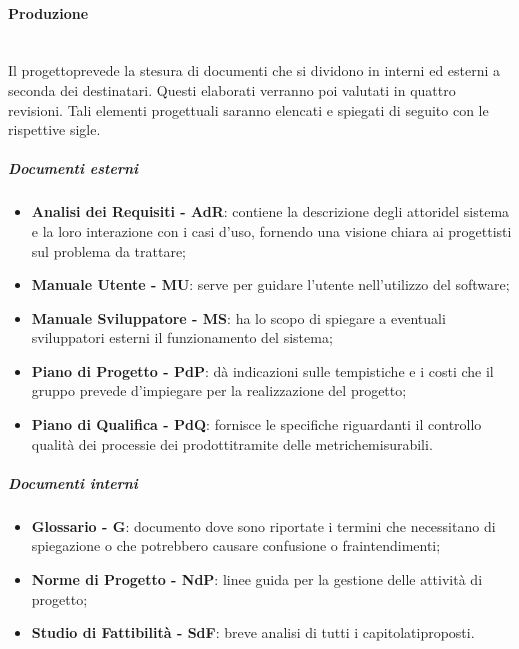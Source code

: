             \paragraph{Produzione}\mbox{}\\ [1mm]
                    Il progetto\glosp prevede la stesura di documenti che si dividono in interni ed esterni a seconda dei destinatari. Questi elaborati verranno poi valutati
                    in quattro revisioni. Tali elementi progettuali saranno elencati e spiegati di seguito con le rispettive sigle.
                \subparagraph{Documenti esterni}
                    \begin{itemize}
                        \item \textbf{Analisi dei Requisiti - AdR}: contiene la descrizione degli attori\glosp del sistema e la loro interazione con i casi d'uso\glo,
                                                                    fornendo una visione chiara ai progettisti sul problema da trattare;
                        \item \textbf{Manuale Utente - MU}: serve per guidare l'utente nell'utilizzo del software;
                        \item \textbf{Manuale Sviluppatore - MS}: ha lo scopo di spiegare a eventuali sviluppatori esterni il funzionamento
                                                                  del sistema;
                        \item \textbf{Piano di Progetto - PdP}: dà indicazioni sulle tempistiche e i costi che il gruppo prevede d'impiegare
                                                                per la realizzazione del progetto\glo;
                        \item \textbf{Piano di Qualifica - PdQ}: fornisce le specifiche riguardanti il controllo qualità dei processi\glosp e dei
                                                                 prodotti\glosp tramite delle metriche\glosp misurabili.
                    \end{itemize}
                \subparagraph{Documenti interni}
                    \begin{itemize}
                        \item \textbf{Glossario - G}: documento dove sono riportate i termini che necessitano di spiegazione o che potrebbero causare confusione o
                                                      fraintendimenti;
                        \item \textbf{Norme di Progetto - NdP}: linee guida per la gestione delle attività di progetto\glo;
                        \item \textbf{Studio di Fattibilità - SdF}: breve analisi di tutti i capitolati\glosp proposti.
                    \end{itemize}
